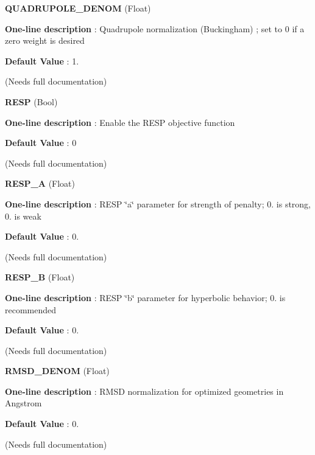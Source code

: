 \begin{DoxyItemize}
\item {\bfseries  Q\-U\-A\-D\-R\-U\-P\-O\-L\-E\-\_\-\-D\-E\-N\-O\-M } (Float) \par
{\bfseries  One-\/line description }\-: Quadrupole normalization (Buckingham) ; set to 0 if a zero weight is desired \par
{\bfseries  Default Value }\-: 1. \par
(Needs full documentation)\end{DoxyItemize}
\begin{DoxyItemize}
\item {\bfseries  R\-E\-S\-P } (Bool) \par
{\bfseries  One-\/line description }\-: Enable the R\-E\-S\-P objective function \par
{\bfseries  Default Value }\-: 0 \par
(Needs full documentation)\end{DoxyItemize}
\begin{DoxyItemize}
\item {\bfseries  R\-E\-S\-P\-\_\-\-A } (Float) \par
{\bfseries  One-\/line description }\-: R\-E\-S\-P \char`\"{}a\char`\"{} parameter for strength of penalty; 0. is strong, 0. is weak \par
{\bfseries  Default Value }\-: 0. \par
(Needs full documentation)\end{DoxyItemize}
\begin{DoxyItemize}
\item {\bfseries  R\-E\-S\-P\-\_\-\-B } (Float) \par
{\bfseries  One-\/line description }\-: R\-E\-S\-P \char`\"{}b\char`\"{} parameter for hyperbolic behavior; 0. is recommended \par
{\bfseries  Default Value }\-: 0. \par
(Needs full documentation)\end{DoxyItemize}
\begin{DoxyItemize}
\item {\bfseries  R\-M\-S\-D\-\_\-\-D\-E\-N\-O\-M } (Float) \par
{\bfseries  One-\/line description }\-: R\-M\-S\-D normalization for optimized geometries in Angstrom \par
{\bfseries  Default Value }\-: 0. \par
(Needs full documentation)\end{DoxyItemize}
